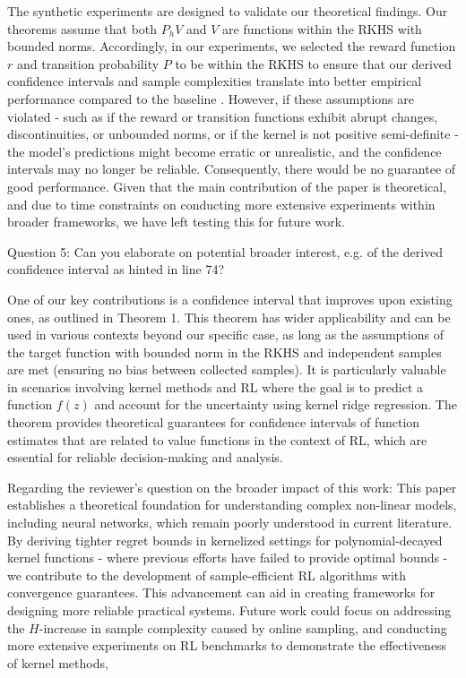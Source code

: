 \documentclass{article}
\begin{document}
The synthetic experiments are designed to validate our theoretical findings. Our theorems assume that both  $P_h V$ and $V$ are functions within the RKHS with bounded norms. Accordingly, in our experiments, we selected the reward function $r$ and transition probability $P$ to be within the RKHS to ensure that our derived confidence intervals and sample complexities translate into better empirical performance compared to the baseline \cite{qiu2021reward}. However, if these assumptions are violated - such as if the reward or transition functions exhibit abrupt changes, discontinuities, or unbounded norms, or if the kernel is not positive semi-definite - the model's predictions might become erratic or unrealistic, and the confidence intervals may no longer be reliable. Consequently, there would be no guarantee of good performance. Given that the main contribution of the paper is theoretical, and due to time constraints on conducting more extensive experiments within broader frameworks, we have left testing this for future work.

Question 5:
Can you elaborate on potential broader interest, e.g. of the derived confidence interval as hinted in line 74?

One of our key contributions is a confidence interval that improves upon existing ones, as outlined in Theorem 1. This theorem has wider applicability and can be used in various contexts beyond our specific case, as long as the assumptions of the target function with bounded norm in the RKHS and independent samples are met (ensuring no bias between collected samples). It is particularly  valuable in scenarios involving kernel methods and RL where the goal is to predict a function $f(z)$ and account for the uncertainty using kernel ridge regression. The theorem provides theoretical guarantees for confidence intervals of function estimates that are related to value functions in the context of RL, which are essential for reliable decision-making and analysis. 

Regarding the reviewer's question on the broader impact of this work: This paper establishes a theoretical foundation for understanding complex non-linear models, including neural networks, which remain poorly understood in current literature. By deriving tighter regret bounds in kernelized settings for polynomial-decayed kernel functions - where previous efforts have failed to provide optimal bounds - we contribute to the development of sample-efficient RL algorithms with convergence guarantees. This advancement can aid in creating frameworks for designing more reliable practical systems. Future work could focus on addressing the $H$-increase in sample complexity caused by online sampling, and conducting more extensive experiments on RL benchmarks to demonstrate the effectiveness of kernel methods,
\end{document}
